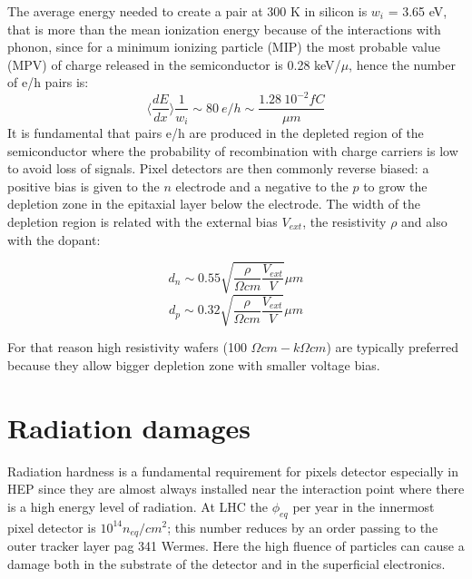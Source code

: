     The average energy needed to create a pair at 300 K in silicon is $w_i$ = 3.65 eV, that is more than the mean ionization energy because of the interactions with phonon, since for a minimum ionizing particle (MIP) the most probable value (MPV) of charge released in the semiconductor is 0.28 keV/$\mu$, hence the number of e/h pairs is: 
    \begin{equation}
        \langle \frac{dE}{dx}\rangle \frac{1}{w_i} \sim 80 \: e/h \sim \frac{1.28 \:10^{-2}fC}{\mu m}
    \end{equation}
    It is fundamental that pairs e/h are produced in the depleted region of the semiconductor where the probability of recombination with charge carriers is low to avoid loss of signals. Pixel detectors are then commonly reverse biased: a positive bias is given to the $n$ electrode and a negative to the $p$ to grow the depletion zone in the epitaxial layer below the electrode. The width of the depletion region is related with the external bias $V_{ext}$, the resistivity $\rho$ and also with the dopant:
    \begin{multicols}{2}
        \begin{equation}
            d_{n} \sim 0.55 \sqrt{\frac{\rho}{\Omega cm}\frac{V_{ext}}{V}} \mu m 
        \end{equation}\break
        \begin{equation}
            d_{p} \sim 0.32 \sqrt{\frac{\rho}{\Omega cm}\frac{V_{ext}}{V}} \mu m
        \end{equation}
        \label{eq:deplation_d}
    \end{multicols}
    For that reason high resistivity wafers (100 $\Omega cm - k\Omega cm$) are typically preferred because they allow bigger depletion zone with smaller voltage bias. 

\section{Radiation damages}
    Radiation hardness is a fundamental requirement for pixels detector especially in HEP since they are almost always installed near the interaction point where there is a high energy level of radiation. At LHC the $\phi_{eq}$ per year in the innermost pixel detector is $10^{14} n_{eq}/cm^2$; this number reduces by an order passing to the outer tracker layer \cite{K-Wermes} pag 341 Wermes. Here the high fluence of particles can cause a damage both in the substrate of the detector and in the superficial electronics. 
    
